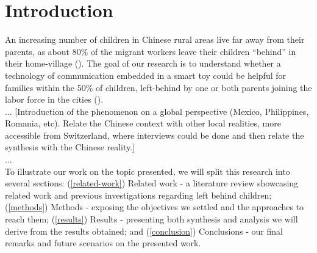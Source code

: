 \section{Introduction}
\label{sec:introduction}


An increasing number of children in Chinese rural areas live far away from their parents, as about 80\% of the migrant workers leave their children “behind” in their home-village (\cite{guo2017effect}). The goal of our research is to understand whether a technology of communication embedded in a smart toy could be helpful for families within the 50\% of children, left-behind by one or both parents joining the labor force in the cities (\cite{bai2017effect}).\\
...
[Introduction of the phenomenon on a global perspective (Mexico, Philippines, Romania, etc). Relate the Chinese context with other local realities, more accessible from Switzerland, where interviews could be done and then relate the synthesis with the Chinese reality.]\\
...\\


To illustrate our work on the topic presented, we will split this research into several sections: (\ref{related-work}) Related work - a literature review showcasing related work and previous investigations regarding left behind children; (\ref{methods}) Methods - exposing the objectives we settled and the approaches to reach them; (\ref{results}) Results - presenting both synthesis and analysis we will derive from the results obtained; and (\ref{conclusion}) Conclusions - our final remarks and future scenarios on the presented work.

